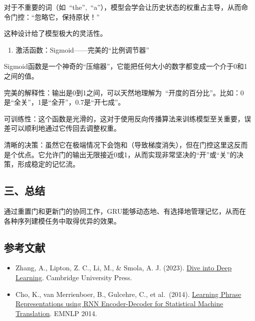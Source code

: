 对于不重要的词（如~``the'',~``a''），模型会学会让历史状态的权重占主导，从而命令门控：``忽略它，保持原状！''

这种设计给了模型极大的灵活性。

\begin{enumerate}
\def\labelenumi{\arabic{enumi}.}
\setcounter{enumi}{2}
\tightlist
\item
  激活函数：Sigmoid------完美的``比例调节器''
\end{enumerate}

Sigmoid函数是一个神奇的``压缩器''，它能把任何大小的数字都变成一个介于0和1之间的值。

完美的解释性：输出是0到1之间，可以天然地理解为~``开度的百分比''。比如：0是``全关''，1是``全开''，0.7是``开七成''。

可训练性：这个函数是光滑的，这对于使用反向传播算法来训练模型至关重要，误差可以顺利地通过它传回去调整权重。

清晰的决策：虽然它在极端情况下会饱和（导致梯度消失），但在门控这里这反而是个优点。它允许门的输出无限接近0或1，从而实现非常坚决的``开''或``关''的决策，形成稳定的记忆流。

\hypertarget{ux4e09ux603bux7ed3}{%
\subsection{三、总结}\label{ux4e09ux603bux7ed3}}

通过重置门和更新门的协同工作，GRU能够动态地、有选择地管理记忆，从而在各种序列建模任务中取得优异的效果。

\hypertarget{ux53c2ux8003ux6587ux732e-20}{%
\subsection{参考文献}\label{ux53c2ux8003ux6587ux732e-20}}

\vspace{0.25em}
\begin{itemize}
\tightlist
\item
  Zhang, A., Lipton, Z. C., Li, M., \& Smola, A. J. (2023). \href{https://D2L.ai}{Dive into Deep Learning}. Cambridge University Press.
\item
  Cho, K., van Merrienboer, B., Gulcehre, C., et al.~(2014). \href{https://arxiv.org/abs/1406.1078}{Learning Phrase Representations using RNN Encoder-Decoder for Statistical Machine Translation}. EMNLP 2014.
\end{itemize}

\clearpage

